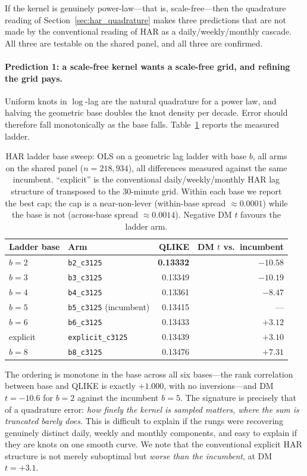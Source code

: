 If the kernel is genuinely power-law---that is, scale-free---then the
quadrature reading of Section~\ref{sec:har_quadrature} makes three predictions
that are not made by the conventional reading of HAR as a
daily/weekly/monthly cascade. All three are testable on the shared panel, and
all three are confirmed.

\paragraph{Prediction 1: a scale-free kernel wants a scale-free grid, and
refining the grid pays.} Uniform knots in $\log$-lag are the natural quadrature
for a power law, and halving the geometric base doubles the knot density per
decade. Error should therefore fall monotonically as the base falls.
Table~\ref{tab:ladder} reports the measured ladder.

\begin{table}[H]
\centering
\caption{HAR ladder base sweep: OLS on a geometric lag ladder with base $b$,
all arms on the shared panel ($n = 218{,}934$), all differences measured
against the same incumbent. ``explicit'' is the conventional
daily/weekly/monthly HAR lag structure of \citet{Corsi2009} transposed to the
30-minute grid. Within each base we report the best cap; the cap is a
near-non-lever (within-base spread $\approx 0.0001$) while the base is not
(across-base spread $\approx 0.0014$). Negative DM $t$ favours the ladder arm.}
\label{tab:ladder}
\begin{tabular}{llrr}
\toprule
Ladder base & Arm & QLIKE & DM $t$ vs.\ incumbent \\
\midrule
$b=2$      & \texttt{b2\_c3125}       & \textbf{0.13332} & $-10.58$ \\
$b=3$      & \texttt{b3\_c3125}       & 0.13349 & $-10.19$ \\
$b=4$      & \texttt{b4\_c3125}       & 0.13361 & $-8.47$ \\
$b=5$      & \texttt{b5\_c3125} (incumbent) & 0.13415 & --- \\
$b=6$      & \texttt{b6\_c3125}       & 0.13433 & $+3.12$ \\
explicit   & \texttt{explicit\_c3125} & 0.13439 & $+3.10$ \\
$b=8$      & \texttt{b8\_c3125}       & 0.13476 & $+7.31$ \\
\bottomrule
\end{tabular}
\end{table}

The ordering is monotone in the base across all six bases---the rank
correlation between base and QLIKE is exactly $+1.000$, with no
inversions---and DM $t = -10.6$ for $b{=}2$ against the incumbent $b{=}5$. The
signature is
precisely that of a quadrature error: \emph{how finely the kernel is sampled
matters, where the sum is truncated barely does}. This is difficult to explain
if the rungs were recovering genuinely distinct daily, weekly and monthly
components, and easy to explain if they are knots on one smooth curve. We note
that the conventional explicit HAR structure is not merely suboptimal but
\emph{worse than the incumbent}, at DM $t = +3.1$.

